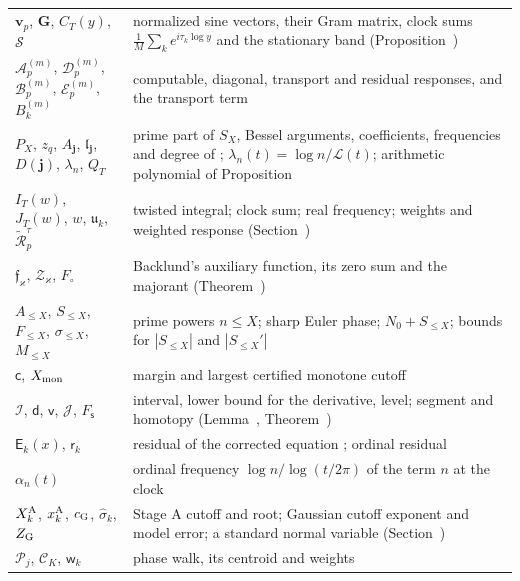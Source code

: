 \documentclass[preprint,12pt]{elsarticle}
\makeatletter
\let\CG@origref\ref
\let\CG@origeqref\eqref
\newcommand{\CG@gettip}[1]{\@ifundefined{CGTip@#1}{Reference: #1}{\csname CGTip@#1\endcsname}}
\DeclareRobustCommand{\CGref}[1]{\pdftooltip{\CG@origref{#1}}{\CG@gettip{#1}}}
\DeclareRobustCommand{\CGeqref}[1]{\pdftooltip{\CG@origeqref{#1}}{\CG@gettip{#1}}}
\numberwithin{equation}{section}
\theoremstyle{plain}
\theoremstyle{definition}
\theoremstyle{remark}
\newcommand{\NO}{N_0}
\newcommand{\lL}{\mathcal L}
\makeatother
\begin{document}
\begin{center}
\begin{longtable}{p{}p{}}
$\mathbf v_p$, $\mathbf G$, $C_T(y)$, $\mathcal S$ & normalized sine vectors, their Gram matrix, clock sums $\frac1M\sum_ke^{i\tau_k\log y}$ and the stationary band (Proposition~\CGref{prop:almost_orthogonal})\\
$\mathcal A^{(m)}_p$, $\mathcal D^{(m)}_p$, $\mathcal B^{(m)}_p$, $\mathcal E^{(m)}_p$, $B^{(m)}_k$ & computable, diagonal, transport and residual responses, and the transport term \CGeqref{eq:computable_parts}\\
$P_X$, $z_q$, $A_{\mathbf j}$, $\mathfrak l_{\mathbf j}$, $D(\mathbf j)$, $\lambda_n$, $Q_T$ & prime part of $S_X$, Bessel arguments, coefficients, frequencies and degree of \CGeqref{eq:bessel_expansion}; $\lambda_n(t)=\log n/\lL(t)$; arithmetic polynomial of Proposition~\CGref{prop:spectral_barrier}\\
$I_T(w)$, $J_T(w)$, $w$, $\mathfrak u_k$, $\widetilde{\mathcal R}^\tau_p$ & twisted integral; clock sum; real frequency; weights and weighted response (Section~\CGref{subsec:twist})\\
$\mathfrak f_\varkappa$, $\mathcal Z_\varkappa$, $F_\circ$ & Backlund's auxiliary function, its zero sum and the majorant (Theorem~\CGref{thm:known_backlund})\\
$A_{\le X}$, $S_{\le X}$, $F_{\le X}$, $\sigma_{\le X}$, $M_{\le X}$ & prime powers $n\le X$; sharp Euler phase; $\NO+S_{\le X}$; bounds for $|S_{\le X}|$ and $|S_{\le X}'|$ \CGeqref{eq:sharp_def}\\
$\mathsf c$, $X_{\rm mon}$ & margin and largest certified monotone cutoff \CGeqref{eq:Xmon}\\
$\mathscr I$, $\mathsf d$, $\mathsf v$, $\mathscr J$, $F_{\mathsf s}$ & interval, lower bound for the derivative, level; segment and homotopy (Lemma~\CGref{lem:certified_root}, Theorem~\CGref{thm:continuation})\\
$\mathsf E_k(x)$, $\mathsf r_k$ & residual of the corrected equation \CGeqref{eq:equation_residual}; ordinal residual \CGeqref{eq:ordinal_residual}\\
$\alpha_n(t)$ & ordinal frequency $\log n/\log(t/2\pi)$ of the term $n$ at the clock \CGeqref{eq:ordinal_frequency}\\
$X^{\rm A}_k$, $x^{\rm A}_k$, $c_{\rm G}$, $\hat\sigma_k$, $Z_{\rm G}$ & Stage A cutoff and root; Gaussian cutoff exponent and model error; a standard normal variable (Section~\CGref{subsec:rule})\\
$\mathscr P_j$, $\mathscr C_K$, $\mathsf w_k$ & phase walk, its centroid and weights \CGeqref{eq:walk_def}\\

\end{longtable}
\end{center}
\end{document}
